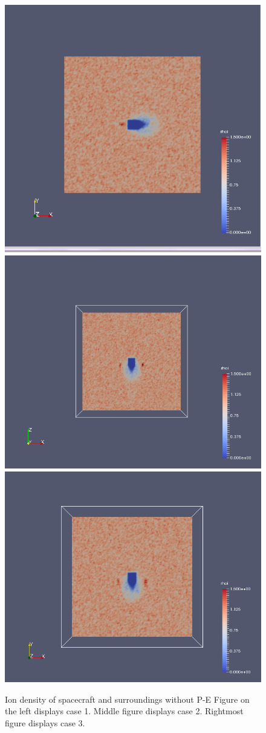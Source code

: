     \begin{figure}
        \includegraphics[width = 0.3 \textwidth]{images/ion_density_case1}
        \includegraphics[width = 0.3 \textwidth]{images/ion_density_x-z_case2}
	\includegraphics[width = 0.3 \textwidth]{images/ion_density_x-y_case3}
        \caption{Ion density of spacecraft and surroundings without P-E Figure on the left displays case 1. Middle figure displays case 2. Rightmost figure displays case 3.}
    \end{figure}

